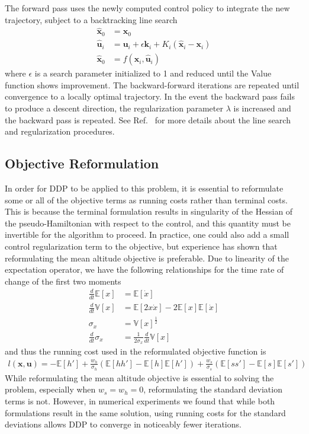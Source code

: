\documentclass[journal ]{new-aiaa}
\newcommand{\state}{\ensuremath{\mathbf{x}}}
\newcommand{\control}{\ensuremath{\mathbf{u}}}
\newcommand{\E}[1]{\mathbb{E}\left[#1\right]}
\newcommand{\V}[1]{\mathbb{V}[#1]}
\begin{document}
The forward pass uses the newly computed control policy to integrate the new trajectory, subject to a backtracking line search
\begin{align}
\hat{\state}_0 &= \state_0 \\
\hat{\control}_{i} &= \control_i + \epsilon \mathbf{k}_i + K_i(\hat{\state}_i - \state_i)\\
\hat{\state}_0 &= f(\hat{\state}_i,\hat{\control}_i)
\end{align}
where $\epsilon$ is a search parameter initialized to 1 and reduced until the Value function shows improvement. The backward-forward iterations are repeated until convergence to a locally optimal trajectory. In the event the backward pass fails to produce a descent direction, the regularization parameter $\lambda$ is increased and the backward pass is repeated. See Ref.~\cite{DDP_ControlLimited} for more details about the line search and regularization procedures. 
%
\subsection*{Objective Reformulation}
In order for DDP to be applied to this problem, it is essential to reformulate some or all of the objective terms as running costs rather than terminal costs. This is because the terminal formulation results in singularity of the Hessian of the pseudo-Hamiltonian with respect to the control, and this quantity must be invertible for the algorithm to proceed. In practice, one could also add a small control regularization term to the objective, but experience has shown that reformulating the mean altitude objective is preferable. Due to linearity of the expectation operator, we have the following relationships for the time rate of change of the first two moments
\begin{align}
\frac{d }{d t}\E{x} &= \E{\dot{x}} \\
\frac{d }{d t}\V{x} &= \E{2x\dot{x}} - 2\E{x}\E{\dot{x}} \\
\sigma_x &= \V{x}^{\frac{1}{2}} \\
\frac{d }{d t}\sigma_x &= \frac{1}{2\sigma_x}\frac{d }{d t}\V{x}
\end{align}
and thus the running cost used in the reformulated objective function is 
\begin{align}
l(\state,\control) = -\E{h'} +  \frac{w_h}{\sigma_h}(\E{hh'}-\E{h}\E{h'}) + \frac{w_s}{\sigma_s}(\E{ss'}-\E{s}\E{s'})
\end{align}
While reformulating the mean altitude objective is essential to solving the problem, especially when $w_s=w_h=0$, reformulating the standard deviation terms is not. However, in numerical experiments we found that while both formulations result in the same solution, using running costs for the standard deviations allows DDP to converge in noticeably fewer iterations.
\end{document}
